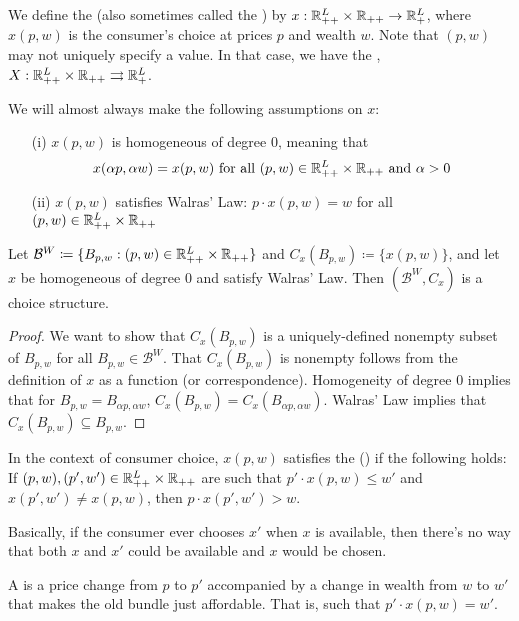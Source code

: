 \documentclass[12pt]{article}
\begin{document}
\begin{definition}
	We define the  (also sometimes called the ) by $x : \mathbb{R}^L_{++} \times \mathbb{R}_{++} \to \mathbb{R}^L_+$, where $x(p,w)$ is the consumer's choice at prices $p$ and wealth $w$. Note that $(p,w)$ may not uniquely specify a value. In that case, we have the , $X: \mathbb{R}^L_{++} \times \mathbb{R}_{++} \rightrightarrows \mathbb{R}^L_+$.
\end{definition}

\begin{assumption}
We will almost always make the following assumptions on $x$:
\begin{itemize}
	\item[(i)] $x(p,w)$ is homogeneous of degree 0, meaning that
	\[
	x(\alpha p ,\alpha w) = x(p,w) \text{ for all } (p,w) \in \mathbb{R}^L_{++} \times \mathbb{R}_{++} \text{ and } \alpha > 0
	\]
	\item[(ii)] $x(p,w)$ satisfies Walras' Law: $p \cdot x(p,w) = w$ for all $(p,w) \in \mathbb{R}^L_{++} \times \mathbb{R}_{++}$
\end{itemize}
\end{assumption}
\begin{proposition}\label{prop:walras_law_choice_structure}
	Let $\mathcal{B}^W \coloneqq \{B_{p,w} : (p,w) \in \mathbb{R}^L_{++} \times \mathbb{R}_{++}\}$ and $C_x(B_{p,w}) \coloneqq \{x(p,w)\}$, and let $x$ be homogeneous of degree 0 and satisfy Walras' Law. Then $(\mathcal{B}^W,C_x)$ is a choice structure.
\end{proposition}
\begin{proof}
	We want to show that $C_x(B_{p,w})$ is a uniquely-defined nonempty subset of $B_{p,w}$ for all $B_{p,w} \in \mathcal{B}^W$. That $C_x(B_{p,w})$ is nonempty follows from the definition of $x$ as a function (or correspondence). Homogeneity of degree 0 implies that for $B_{p,w} = B_{\alpha p,\alpha w}$, $C_x(B_{p,w}) = C_x(B_{\alpha p,\alpha w})$. Walras' Law implies that $C_x(B_{p,w}) \subseteq B_{p,w}$.
\end{proof}

\begin{definition}
	In the context of consumer choice, $x(p,w)$ satisfies the  () if the following holds: If $(p,w),(p',w') \in \mathbb{R}^L_{++} \times \mathbb{R}_{++}$ are such that $p' \cdot x(p,w) \le w'$ and $x(p',w') \ne x(p,w)$, then $p\cdot x(p',w') > w$.
\end{definition}
\begin{remark}
	Basically, if the consumer ever chooses $x'$ when $x$ is available, then there's no way that both $x$ and $x'$ could be available and $x$ would be chosen.
\end{remark}
\begin{definition}
	A  is a price change from $p$ to $p'$ accompanied by a change in wealth from $w$ to $w'$ that makes the old bundle just affordable. That is, such that $p' \cdot x(p,w) = w'$.
\end{definition}
\end{document}
